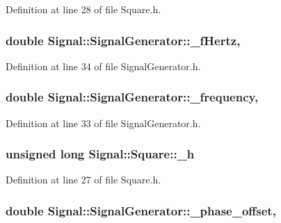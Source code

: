 Definition at line 28 of file Square.\+h.

\hypertarget{class_signal_1_1_signal_generator_a85a4702347352bab1c71e0a8df8437d6}{
\subsubsection[{\+\_\+f\+Hertz}]{\setlength{\rightskip}{0pt plus 5cm}double Signal\+::\+Signal\+Generator\+::\+\_\+f\+Hertz\hspace{0.3cm}{\ttfamily [protected]}, {\ttfamily [inherited]}}}\label{class_signal_1_1_signal_generator_a85a4702347352bab1c71e0a8df8437d6}


Definition at line 34 of file Signal\+Generator.\+h.

\hypertarget{class_signal_1_1_signal_generator_a7f107461333bce68c5dad412db96a8c2}{
\subsubsection[{\+\_\+frequency}]{\setlength{\rightskip}{0pt plus 5cm}double Signal\+::\+Signal\+Generator\+::\+\_\+frequency\hspace{0.3cm}{\ttfamily [protected]}, {\ttfamily [inherited]}}}\label{class_signal_1_1_signal_generator_a7f107461333bce68c5dad412db96a8c2}


Definition at line 33 of file Signal\+Generator.\+h.

\hypertarget{class_signal_1_1_square_a841e8057c59c3dd07ba672420a7fac4a}{
\subsubsection[{\+\_\+h}]{\setlength{\rightskip}{0pt plus 5cm}unsigned long Signal\+::\+Square\+::\+\_\+h\hspace{0.3cm}{\ttfamily [protected]}}}\label{class_signal_1_1_square_a841e8057c59c3dd07ba672420a7fac4a}


Definition at line 27 of file Square.\+h.

\hypertarget{class_signal_1_1_signal_generator_a6b4444d46747c8517171edbbf4b5588f}{
\subsubsection[{\+\_\+phase\+\_\+offset}]{\setlength{\rightskip}{0pt plus 5cm}double Signal\+::\+Signal\+Generator\+::\+\_\+phase\+\_\+offset\hspace{0.3cm}{\ttfamily [protected]}, {\ttfamily [inherited]}}}\label{class_signal_1_1_signal_generator_a6b4444d46747c8517171edbbf4b5588f}



